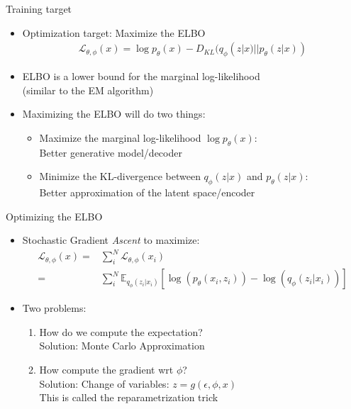 \documentclass[10pt]{beamer}
\begin{document}
\begin{frame}{Training target}

\begin{itemize}
\item Optimization target: Maximize the ELBO
\begin{align*}
\mathcal{L}_{\theta,\phi}(x) = \log p_\theta(x) - D_{KL}(q_\phi(z|x)||p_\theta(z|x))
\end{align*}
\item ELBO is a lower bound for the marginal log-likelihood\\ (similar to the EM algorithm)
\pause
\item Maximizing the ELBO will do two things:
\begin{itemize}
\item Maximize the marginal log-likelihood $\log p_\theta(x)$:\\Better generative model/decoder
\item Minimize the KL-divergence between $q_\phi(z|x)$ and $p_\theta(z|x)$:\\Better approximation of the latent space/encoder
\end{itemize}
\end{itemize}

\end{frame}



\begin{frame}{Optimizing the ELBO}

\begin{itemize}
\item Stochastic Gradient \emph{Ascent} to maximize:
\begin{align*}
\mathcal{L}_{\theta,\phi}(x) =& \sum_i^N \mathcal{L}_{\theta,\phi}(x_i)\\
=& \sum_i^N \mathbb{E}_{q_\phi(z_i|x_i)}\left[\log \left(p_\theta(x_i,z_i)\right) - \log(q_\phi(z_i|x_i))\right]
\end{align*}
\pause
\item Two problems:
\begin{enumerate}
\item How do we compute the expectation? \\ Solution: {\color{uured} Monte Carlo Approximation}\pause
\item How compute the gradient wrt $\phi$?\\ Solution: {\color{uured}Change of variables}: $z = g(\epsilon, \phi, x)$\\This is called {\color{uured}the reparametrization trick}
\end{enumerate}
\end{itemize}

\end{frame}
\end{document}
